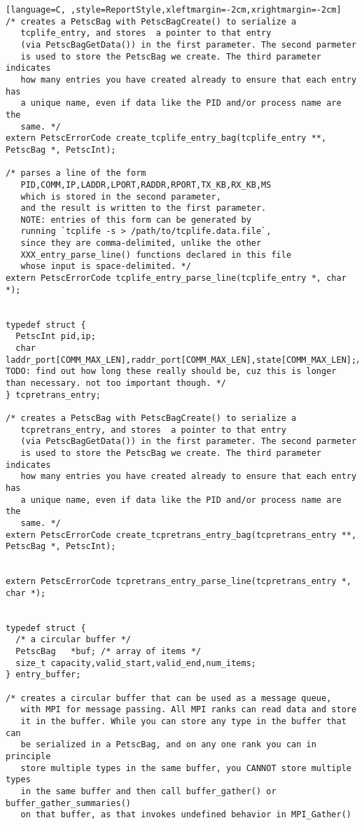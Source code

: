 \documentclass[11pt]{article}
\begin{document}
\begin{lstlisting}[language=C, ,style=ReportStyle,xleftmargin=-2cm,xrightmargin=-2cm]
/* creates a PetscBag with PetscBagCreate() to serialize a
   tcplife_entry, and stores  a pointer to that entry
   (via PetscBagGetData()) in the first parameter. The second parmeter
   is used to store the PetscBag we create. The third parameter indicates
   how many entries you have created already to ensure that each entry has
   a unique name, even if data like the PID and/or process name are the 
   same. */
extern PetscErrorCode create_tcplife_entry_bag(tcplife_entry **, PetscBag *, PetscInt);

/* parses a line of the form 
   PID,COMM,IP,LADDR,LPORT,RADDR,RPORT,TX_KB,RX_KB,MS
   which is stored in the second parameter, 
   and the result is written to the first parameter.
   NOTE: entries of this form can be generated by 
   running `tcplife -s > /path/to/tcplife.data.file`, 
   since they are comma-delimited, unlike the other 
   XXX_entry_parse_line() functions declared in this file
   whose input is space-delimited. */
extern PetscErrorCode tcplife_entry_parse_line(tcplife_entry *, char *);


typedef struct {
  PetscInt pid,ip;
  char     laddr_port[COMM_MAX_LEN],raddr_port[COMM_MAX_LEN],state[COMM_MAX_LEN];/* TODO: find out how long these really should be, cuz this is longer than necessary. not too important though. */
} tcpretrans_entry;

/* creates a PetscBag with PetscBagCreate() to serialize a
   tcpretrans_entry, and stores  a pointer to that entry
   (via PetscBagGetData()) in the first parameter. The second parmeter
   is used to store the PetscBag we create. The third parameter indicates
   how many entries you have created already to ensure that each entry has
   a unique name, even if data like the PID and/or process name are the 
   same. */
extern PetscErrorCode create_tcpretrans_entry_bag(tcpretrans_entry **, PetscBag *, PetscInt);


extern PetscErrorCode tcpretrans_entry_parse_line(tcpretrans_entry *, char *);


typedef struct {
  /* a circular buffer */
  PetscBag   *buf; /* array of items */
  size_t capacity,valid_start,valid_end,num_items;
} entry_buffer;

/* creates a circular buffer that can be used as a message queue, 
   with MPI for message passing. All MPI ranks can read data and store
   it in the buffer. While you can store any type in the buffer that can
   be serialized in a PetscBag, and on any one rank you can in principle
   store multiple types in the same buffer, you CANNOT store multiple types
   in the same buffer and then call buffer_gather() or buffer_gather_summaries()
   on that buffer, as that invokes undefined behavior in MPI_Gather()


\end{lstlisting}
\end{document}
